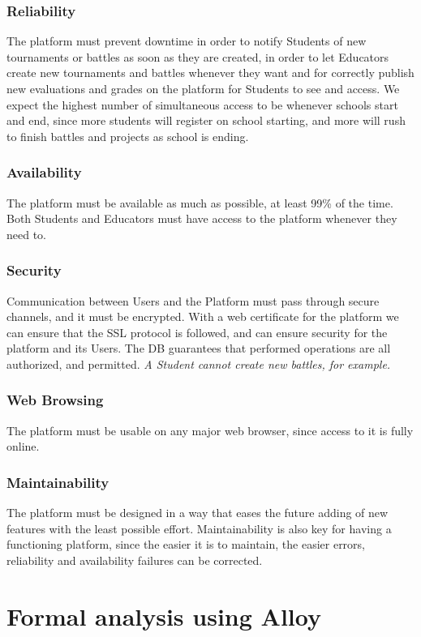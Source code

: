\documentclass{article}
\begin{document}
{\subsubsection{Reliability}
The platform must prevent downtime in order to notify Students of new tournaments or battles as soon as they are created, in order to let
Educators create new tournaments and battles whenever they want and for correctly publish new evaluations and grades on the platform for
Students to see and access.
We expect the highest number of simultaneous access to be whenever schools start and end, since more students will register on school starting,
and more will rush to finish battles and projects as school is ending.
\subsubsection{Availability}
The platform must be available as much as possible, at least 99\% of the time.
Both Students and Educators must have access to the platform whenever they need to.
\subsubsection{Security}
Communication between Users and the Platform must pass through secure channels, and it must be encrypted.
With a web certificate for the platform we can ensure that the SSL protocol is followed, and can ensure security for the platform and its Users.
The DB guarantees that performed operations are all authorized, and permitted.
\textit{A Student cannot create new battles, for example.}
\subsubsection{Web Browsing}
The platform must be usable on any major web browser, since access to it is fully online.
\subsubsection{Maintainability}
The platform must be designed in a way that eases the future adding of new features with the least possible effort.
Maintainability is also key for having a functioning platform, since the easier it is to maintain, the easier errors, reliability and availability failures
can be corrected.
\newpage
\pagestyle{FormalAnalysisAlloyStyle}

\section{Formal analysis using Alloy}

}
\end{document}
